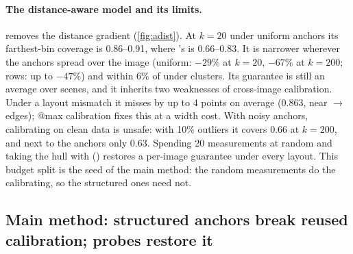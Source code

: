 \paragraph{The distance-aware model and its limits.}
\mDist removes the distance gradient (\cref{fig:adist}).
At $k=20$ under uniform anchors its farthest-bin coverage is 0.86--0.91, where \mHybrid's is 0.66--0.83.
It is narrower wherever the anchors spread over the image (uniform: $-29\%$ at $k=20$, $-67\%$ at $k=200$; rows: up to $-47\%$) and within 6\% of \mHybrid under clusters.
Its guarantee is still an average over scenes, and it inherits two weaknesses of cross-image calibration.
Under a layout mismatch it misses by up to 4 points on average (0.863, near $\to$ edges); @max calibration fixes this at a width cost.
With noisy anchors, calibrating on clean data is unsafe: with 10\% outliers it covers 0.66 at $k=200$, and next to the anchors only 0.63.
Spending 20 measurements at random and taking the hull with \mLocalSplit (\mDistBoth) restores a per-image guarantee under every layout.
This budget split is the seed of the main method: the random measurements do the calibrating, so the structured ones need not.

\subsection{Main method: structured anchors break reused calibration; probes restore it}
\label{sec:res:failure}
\label{sec:res:dual}

